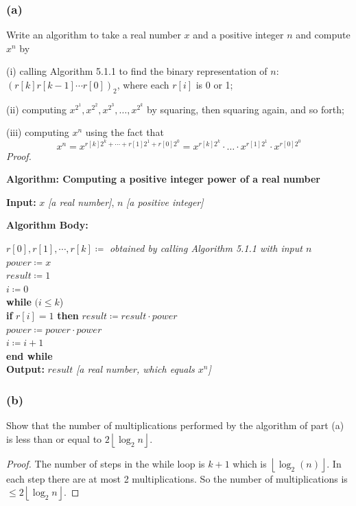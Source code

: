 \documentclass[14pt]{extarticle}
\newcommand{\cy}{\color{cyan}}
\newcommand{\floor}[1]{{\left\lfloor#1\right\rfloor}}
\begin{document}
\subsubsection{(a)}
Write an algorithm to take a real number \(x\) and a positive integer \(n\) and compute \(x^n\) by

(i) calling Algorithm 5.1.1 to find the binary representation of \(n\): \((r[k] r[k - 1] \cdots r[0])_2\), where each 
\(r[i]\) is 0 or 1; 

(ii) computing \(x^{2^1}, x^{2^2}, x^{2^3}, \ldots, x^{2^k}\) by squaring, then squaring again, and so forth;

(iii) computing \(x^n\) using the fact that 
\[
x^n = x^{r[k]2^k + \cdots + r[1]2^1 + r[0]2^0} = x^{r[k]2^k} \cdot \ldots \cdot x^{r[1]2^1} \cdot x^{r[0]2^0}
\]
{\it Proof.}
\begin{tcolorbox}[colframe=cyan]
{\bf \cy Algorithm: Computing a positive integer power of a real number}

{\bf Input:} \(x\) {\it [a real number]}, \(n\) {\it [a positive integer]}

{\bf Algorithm Body:}
\begin{tabbing}
\(r[0], r[1], \cdots, r[k] \coloneqq\) {\it obtained by calling Algorithm 5.1.1 with input \(n\)} \\
\(power \coloneqq x\) \\
\(result \coloneqq 1\) \\
\(i \coloneqq 0\) \\ 
{\bf while} \= \((i \leq k\)) \\
            \> {\bf if} \(r[i] = 1\) {\bf then} \(result \coloneqq result \cdot power\) \\
            \> \(power \coloneqq power \cdot power\) \\
            \> \(i \coloneqq i + 1\) \\
{\bf end while} \\
{\bf Output:} \(result\) {\it [a real number, which equals \(x^n\)]}
\end{tabbing}
\end{tcolorbox}

\subsubsection{(b)}
Show that the number of multiplications performed by the algorithm of part (a) is less than or equal to 
\(2\floor{\log_2 n}\).

\begin{proof}
The number of steps in the while loop is \(k+1\) which is \(\floor{\log_2(n)}\). In each step there are at most 2 
multiplications. So the number of multiplications is \(\leq 2 \floor{\log_2 n}\).
\end{proof}
\end{document}
